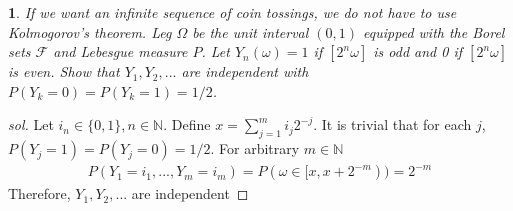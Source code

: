 \documentclass{report}
\newtheorem{ex}{}[section]
\newcommand{\N}{\mathbb N}
\begin{document}
\begin{ex}
If we want an infinite sequence of coin tossings, we do not have to use Kolmogorov's theorem. Leg $\Omega$ be the unit interval $(0,1)$ equipped with the Borel sets $\mathcal{F}$ and Lebesgue measure $P$. Let $Y_n(\omega) = 1$ if $[2^n\omega]$ is odd and 0 if $[2^n\omega]$ is even. Show that $Y_1,Y_2,...$ are independent with $P(Y_k = 0) = P(Y_k= 1) = 1/2$.
\end{ex}
\begin{proof}[sol]
Let $i_n \in \{0,1\}, n \in\N$. Define $x = \sum_{j =1}^m i_j2^{-j}$. It is trivial that for each $j$, $P(Y_j = 1) = P(Y_j = 0) = 1/2$. For arbitrary $m \in \N$
\begin{align*}
	P(Y_1 = i_1,...,Y_m = i_m) = P(\omega \in [x, x + 2^{-m})) = 2^{-m}
\end{align*}
Therefore,  $Y_1,Y_2,...$ are independent 
\end{proof}
\end{document}
